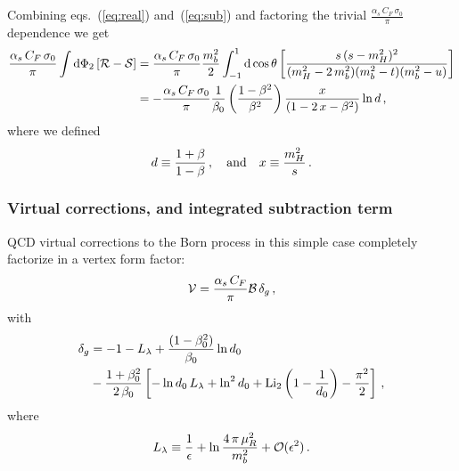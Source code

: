 Combining eqs.~(\ref{eq:real}) and~(\ref{eq:sub}) and factoring
the trivial $\frac{\alpha_s\,C_F\,\sigma_0}{\pi}$ dependence we get
\begin{equation}
  \begin{split}
    \frac{\alpha_s\,C_F\,\sigma_0}{\pi}
    \int{\rm d}\Phi_2 \left[{\cal R} -{\cal S}\right] & =
    \frac{\alpha_s\,C_F\,\sigma_0}{\pi}\frac{m_b^2}{2}
    \int_{-1}^1{\rm d}\cos\theta
    \left[\frac{s\,(s-m_H^2)^2}{(m_H^2-2\,m_b^2)(m_b^2-t)(m_b^2-u)}
    \right]\\
    & = -\frac{\alpha_s\,C_F\,\sigma_0}{\pi}
    \frac{1}{\beta_0}\left(\frac{ 1-\beta^2 }{\beta^2}\right)
    \frac{x}{\left( 1 - 2\,x - \beta^2\right)}\ln d\,,
  \end{split}
\end{equation}
where we defined
\begin{equation}
  d \equiv \frac{1+\beta}{1-\beta}\,,
  \quad {\rm and}\quad x\equiv \frac{m_H^2}{s}\,.
\end{equation}

\subsubsection{Virtual corrections, and integrated subtraction term}
QCD virtual corrections to the Born process in this simple case
completely factorize in a vertex form factor:
\begin{equation}
  {\cal V} = \frac{\alpha_s\,C_F}{\pi}{\cal B}\,\delta_g\,,
\end{equation}
with
\begin{align}
  \delta_g &= -1 - L_{\lambda} +
  \frac{(1-\beta_0^2)}{\beta_0} \ln d_0 \nonumber\\
  &- \frac{1+\beta_0^2}{2\,\beta_0}\left[-\ln d_0\,L_{\lambda} + \ln^2d_0+{\rm Li}_2\left(
      1-\frac{1}{d_0} \right) -\frac{\pi^2}{2} \right]\,,
\end{align}
where
\begin{equation}
  L_{\lambda} \equiv \frac{1}{\epsilon} + \ln\frac{4\,\pi\,\mu_R^2}{m_b^2}
  +{\cal O}(\epsilon^2)\,.
\end{equation}

